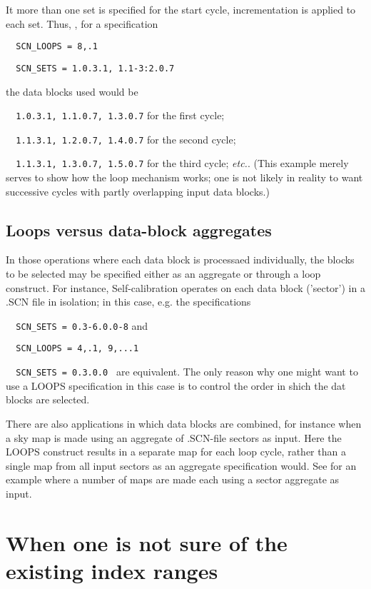	It more than one set is specified for the start cycle, incrementation is applied to each set. Thus, \eg, for a specification
\spbegin
\bi
\item[] \verb/  SCN_LOOPS = 8,.1/
\item[] \verb/  SCN_SETS = 1.0.3.1, 1.1-3:2.0.7/
\ei

the data blocks used would be
\bi
\item[] \verb/  1.0.3.1, 1.1.0.7, 1.3.0.7/ for the first cycle;
\item[] \verb/  1.1.3.1, 1.2.0.7, 1.4.0.7/ for the second cycle;
\item[] \verb/  1.1.3.1, 1.3.0.7, 1.5.0.7/ for the third cycle;
\ei
\spend
{\em etc.}. (This example merely serves to show how the loop mechanism works; one is not likely in reality to want successive cycles with partly overlapping input data blocks.)


\subsection{ Loops versus data-block aggregates }
\label{.loops.vs.aggregates}

	In those operations where each data block is processaed individually, the blocks to be selected may be specified either as an aggregate or through a loop construct. For instance, Self-calibration operates on each data block ('sector') in a .SCN file in isolation; in this case, e.g. the specifications
\bi
\item[]	\verb/	SCN_SETS = 0.3-6.0.0-8/
\ei
and
\bi
\item[]	\verb/	SCN_LOOPS = 4,.1, 9,...1 /
\item[]	\verb/	SCN_SETS = 0.3.0.0 /
\ei
are equivalent. The only reason why one might want to use a LOOPS specification in this case is to control the order in shich the dat blocks are selected.

	There are also applications in which data blocks are combined, for instance when a sky map is made using an aggregate of .SCN-file sectors as input. Here the LOOPS construct results in a separate map for each loop cycle, rather than a single map from all input sectors as an aggregate specification would. See  for an example where a number of maps are made each using a sector aggregate as input.
 

\section{ When one is not sure of the existing index ranges }
\label{.query}

